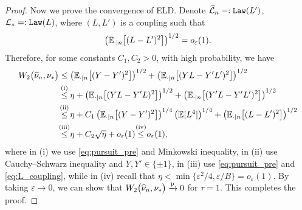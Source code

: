\begin{proof}
    \vspace{0.5\baselineskip}
	\noindent
    Now we prove the convergence of ELD. Denote $\widehat {\mathcal{L}}_{n} =: \mathtt{Law}(L')$, $\mathcal{L}_* =: \mathtt{Law}(L)$, where $(L, L')$ is a coupling such that
    \begin{equation}\label{eq:L_coupling}
        \left( \mathbb{E}_{\cdot | n}\bigl[(L - L')^2\bigr] \right)^{1/2} = o_\varepsilon(1).
    \end{equation}
    Therefore, for some constants $C_1, C_2 > 0$, with high probability, we have
    \begin{align*}
        W_2\bigl( \hat \nu_{n}, \nu_* \bigr)
        & \le
        \left( \E_{\cdot | n}\bigl[(Y - Y')^2\bigr] \right)^{1/2} 
        +
        \left( \E_{\cdot | n}\bigl[(YL - Y'L')^2\bigr] \right)^{1/2} \\
        & \overset{\mathmakebox[0pt][c]{\text{(i)}}}{\le} 
        \eta + \left( \E_{\cdot | n}\bigl[(YL - Y'L)^2\bigr] \right)^{1/2}
        + \left( \E_{\cdot | n}\bigl[(Y'L - Y'L')^2\bigr] \right)^{1/2} \\
        & \overset{\mathmakebox[0pt][c]{\text{(ii)}}}{\le}
        \eta + C_1 \left( \E_{\cdot | n}\bigl[(Y - Y')^2\bigr] \right)^{1/4} \left(\E[L^4]\right)^{1/4}
        + \left( \E_{\cdot | n}\bigl[(L - L')^2\bigr] \right)^{1/2} \\
        & \overset{\mathmakebox[0pt][c]{\text{(iii)}}}{\le}
        \eta + C_2 \sqrt{\eta} + o_\varepsilon(1)
        \overset{\mathmakebox[0pt][c]{\text{(iv)}}}{\le}  o_\varepsilon(1),
    \end{align*}
    where in (i) we use \cref{eq:pursuit_pre} and Minkowski inequality, in (ii) use Cauchy--Schwarz inequality and $Y, Y' \in \{ \pm 1 \}$, in (iii) use \cref{eq:pursuit_pre} and \eqref{eq:L_coupling}, while in (iv) recall that $\eta < \min\{ \varepsilon^2/4, \varepsilon/B \} = o_{\varepsilon}(1)$. By taking $\varepsilon \to 0$, we can show that $W_2\bigl( \widehat \nu_{n}, \nu_* \bigr) \xrightarrow{\mathrm{p}} 0$ for $\tau = 1$. This completes the proof.

\end{proof}
